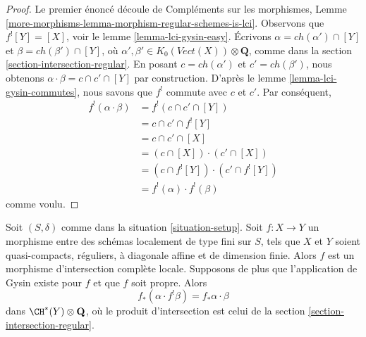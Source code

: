 \begin{proof}
Le premier énoncé découle de
Compléments sur les morphismes, Lemme
\ref{more-morphisms-lemma-morphism-regular-schemes-is-lci}.
Observons que $f^![Y] = [X]$, voir le lemme \ref{lemma-lci-gysin-easy}.
Écrivons $\alpha = ch(\alpha') \cap [Y]$ et $\beta = ch(\beta') \cap [Y]$,
où $\alpha', \beta' \in K_0(\textit{Vect}(X)) \otimes \mathbf{Q}$,
comme dans la section \ref{section-intersection-regular}.
En posant $c = ch(\alpha')$ et $c' = ch(\beta')$, nous obtenons
$\alpha \cdot \beta = c \cap c' \cap [Y]$ par construction.
D'après le lemme \ref{lemma-lci-gysin-commutes}, nous savons que $f^!$
commute avec $c$ et $c'$. Par conséquent,
\begin{align*}
f^!(\alpha \cdot \beta)
& =
f^!(c \cap c' \cap [Y]) \\
& =
c \cap c' \cap f^![Y] \\
& =
c \cap c' \cap [X] \\
& =
(c \cap [X]) \cdot (c' \cap [X]) \\
& =
(c \cap f^![Y]) \cdot (c' \cap f^![Y]) \\
& =
f^!(\alpha) \cdot f^!(\beta)
\end{align*}
comme voulu.
\end{proof}

\begin{lemma}
\label{lemma-projection-formula-regular}
Soit $(S, \delta)$ comme dans la situation \ref{situation-setup}.
Soit $f : X \to Y$ un morphisme entre des schémas localement de type
fini sur $S$, tels que $X$ et $Y$ soient quasi-compacts,
réguliers, à diagonale affine et de dimension finie.
Alors $f$ est un morphisme d'intersection complète locale.
Supposons de plus que l'application de Gysin existe pour $f$
et que $f$ soit propre. Alors
$$
f_*(\alpha \cdot f^!\beta) = f_*\alpha \cdot \beta
$$
dans $\CH^*(Y) \otimes \mathbf{Q}$, où le produit d'intersection
est celui de la section \ref{section-intersection-regular}.
\end{lemma}


